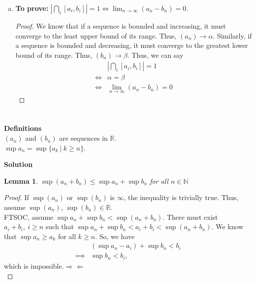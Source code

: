 \documentclass[12pt]{article}
\newtheorem{lemma}[theorem]{Lemma}
\begin{document}
\begin{enumerate}[(a)]
\begin{proof}
                  Thus, $\bigcap_{i}[a_{i}, b_{i}]= [\alpha, \beta]\ne \emptyset$.
            \end{proof}

      \item {\bf To prove: }$|\bigcap_{i}[a_{i}, b_{i}]| =1\iff\lim_{ n \to \infty }(a_{n}-b_{n}) = 0$.
            \begin{proof}
                  We know that if a sequence is bounded and increasing,
                  it must converge to the least upper bound of its range.
                  Thus, $(a_{n})\to \alpha$. Similarly, if a sequence is bounded
                  and decreasing, it must converge to the greatest lower bound of its
                  range. Thus, $(b_{n})\to \beta$. Thus, we can say
                  \begin{align*}
                             & |\bigcap_{i}[a_{i}, b_{i}]| =1         \\
                        \iff & \alpha=\beta                           \\
                        \iff & \lim_{ n \to \infty }(a_{n}-b_{n}) = 0
                  \end{align*}
            \end{proof}
\end{enumerate}
\section{}
 {\bf Definitions}\\
$(a_{n})$ and $(b_{n})$ are sequences in $\mathbb{R}$.\\
$\sup a_{n} = \sup \{ a_{k}\ |\ k\ge n\}$.


      {\bf Solution}

\begin{lemma}$\sup(a_{n}+b_{n})\le \sup a_{n}+ \sup b_{n}$ for all $n\in \mathbb{N}$\end{lemma}
\begin{proof}
      If $\sup (a_n)$ or $\sup (b_n)$ is $\infty$, the inequality is trivially true.
      Thus, assume $\sup(a_n)$, $\sup(b_n) \in \mathbb{R}$.\\
      FTSOC, assume $\sup a_{n} +\sup b_{n}<\sup(a_{n}+b_{n})$.
      There must exist $a_{i}+ b_{i},\  i\ge n$ such that
      $\sup a_{n} +\sup b_{n}<a_{i}+b_{i}<\sup(a_{n}+b_{n})$. We know
      that $\sup a_{n}\ge a_{k}$ for all $k\ge n$. So, we have
      \begin{align*}
                     & (\sup a_{n}-a_{i}) +\sup b_{n}<b_{i} \\
            \implies & \sup b_{n}<b_{i},
      \end{align*}
      which is impossible.\hfill $\Rightarrow\Leftarrow$\\
\end{proof}
\end{document}
